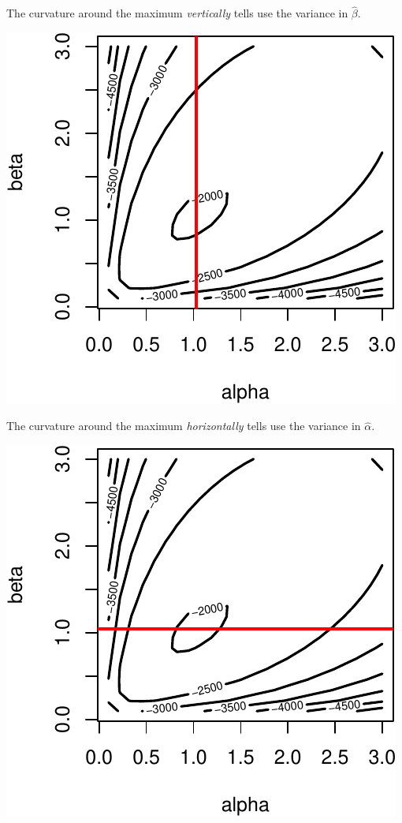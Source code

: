 \documentclass[
]{book}
\begin{document}
The curvature around the maximum \emph{vertically} tells use the
variance in \(\hat{\beta}\).

\includegraphics{04-02-wald-cis_files/figure-latex/unnamed-chunk-5-1.pdf}

The curvature around the maximum \emph{horizontally} tells use the
variance in \(\hat{\alpha}\).

\includegraphics{04-02-wald-cis_files/figure-latex/unnamed-chunk-6-1.pdf}
\end{document}
